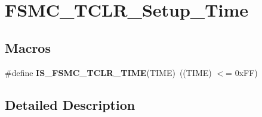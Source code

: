 \hypertarget{group___f_s_m_c___t_c_l_r___setup___time}{\section{F\-S\-M\-C\-\_\-\-T\-C\-L\-R\-\_\-\-Setup\-\_\-\-Time}
\label{group___f_s_m_c___t_c_l_r___setup___time}
}
\subsection*{Macros}
\begin{DoxyCompactItemize}
\item 
\hypertarget{group___f_s_m_c___t_c_l_r___setup___time_ga324848d0d9c0d2aad7ab70873b4a15e9}{\#define {\bfseries I\-S\-\_\-\-F\-S\-M\-C\-\_\-\-T\-C\-L\-R\-\_\-\-T\-I\-M\-E}(T\-I\-M\-E)~((T\-I\-M\-E) $<$= 0x\-F\-F)}\label{group___f_s_m_c___t_c_l_r___setup___time_ga324848d0d9c0d2aad7ab70873b4a15e9}

\end{DoxyCompactItemize}


\subsection{Detailed Description}

